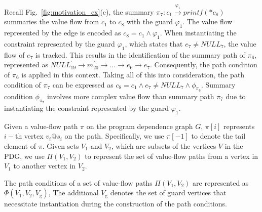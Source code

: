 \begin{example}
\label{example:path_condition}
    Recall Fig.~\ref{fig:motivation_ex}(c),
    the summary $\pi_7: c_1 \xrightarrow{\varphi_1} printf(*c_8)$ summaries the value flow from $c_1$ to $c_8$ with the guard $\varphi_1$. 
    The value flow represented by the edge is encoded as $c_8 = c_1 \land \varphi_1$.
    When instantiating the constraint represented by the guard $\varphi_1$, which states that $e_7 \neq NULL_{7}$, the value flow of $e_7$ is tracked.
    This results in the identification of the summary path of $\pi_6$, represented as $NULL^{\prime}_{19} \rightarrow m^{\prime}_{20} \rightarrow \dots \rightarrow e_{6} \rightarrow e_7$. 
    Consequently, the path condition of $\pi_6$ is applied in this context. 
    Taking all of this into consideration, the path condition of $\pi_7$ can be expressed as $c_8 = c_1 \land e_7 \neq NULL_{7} \land \phi_{\pi_{6}}$.
    Summary condition $\phi_{\pi_{7}}$ involves more complex value flow than summary path $\pi_{7}$ due to instantiating the constraint represented by the guard $\varphi_1$.
\end{example}


Given a value-flow path $\pi$ on the program dependence graph $G$, $\pi[i]$ represents $i-$th vertex $v_i@s_i$ on the path. 
Specifically, we use $\pi[-1]$ to denote the tail element of $\pi$.
Given sets $V_1$ and $V_2$, which are subsets of the vertices $V$ in the PDG, we use $\Pi(V_1, V_2)$ to represent the set of value-flow paths from a vertex in $V_1$ to another vertex in $V_2$.

The path conditions of a set of value-flow paths $\Pi(V_1, V_2)$ are represented as $\Phi(V_1, V_2, V_{\text{g}})$, 
The additional $V_{\text{g}}$ denotes the set of guard vertices that necessitate instantiation during the construction of the path conditions. 


